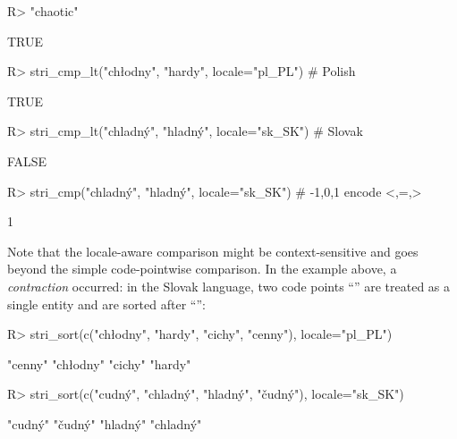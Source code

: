 \documentclass[nojss]{jss}\usepackage[]{graphicx}\usepackage[]{color}
\begin{document}
\begin{Schunk}
\begin{Sinput}
R> "chaotic" %s<% "hard" # current default locale (here: en_AU)
\end{Sinput}
\begin{Soutput}
[1] TRUE
\end{Soutput}
\begin{Sinput}
R> stri_cmp_lt("chłodny", "hardy", locale="pl_PL")  # Polish
\end{Sinput}
\begin{Soutput}
[1] TRUE
\end{Soutput}
\begin{Sinput}
R> stri_cmp_lt("chladný", "hladný", locale="sk_SK") # Slovak
\end{Sinput}
\begin{Soutput}
[1] FALSE
\end{Soutput}
\begin{Sinput}
R> stri_cmp("chladný", "hladný", locale="sk_SK")    # -1,0,1 encode <,=,>
\end{Sinput}
\begin{Soutput}
[1] 1
\end{Soutput}
\end{Schunk}

Note that the locale-aware comparison might be context-sensitive
and goes beyond the simple code-pointwise comparison.
In the example above, a \textit{contraction} occurred: in the Slovak language,
two code points ``'' are treated as a single entity
and are sorted after ``'':

\begin{Schunk}
\begin{Sinput}
R> stri_sort(c("chłodny", "hardy", "cichy", "cenny"), locale="pl_PL")
\end{Sinput}
\begin{Soutput}
[1] "cenny"   "chłodny" "cichy"   "hardy"
\end{Soutput}
\begin{Sinput}
R> stri_sort(c("cudný", "chladný", "hladný", "čudný"), locale="sk_SK")
\end{Sinput}
\begin{Soutput}
[1] "cudný"   "čudný"   "hladný"  "chladný"
\end{Soutput}
\end{Schunk}

\end{document}
